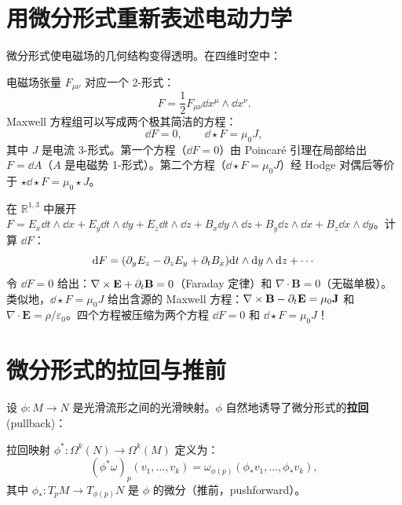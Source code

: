 \section{用微分形式重新表述电动力学}

微分形式使电磁场的几何结构变得透明。在四维时空中：

\begin{definition}[电磁场 2-形式]
电磁场张量 $F_{\mu\nu}$ 对应一个 2-形式：
\begin{equation}
    F = \frac{1}{2} F_{\mu\nu} \dd x^\mu \wedge \dd x^\nu.
\end{equation}
Maxwell 方程组可以写成两个极其简洁的方程：
\begin{equation}
    \dd F = 0, \qquad \dd \star F = \mu_0 J,
\end{equation}
其中 $J$ 是电流 3-形式。第一个方程（$\dd F = 0$）由 Poincaré 引理在局部给出 $F = \dd A$（$A$ 是电磁势 1-形式）。第二个方程（$\dd \star F = \mu_0 J$）经 Hodge 对偶后等价于 $\star \dd \star F = \mu_0 \star J$。

在 $\mathbb{R}^{1,3}$ 中展开 $F = E_x \dd t \wedge \dd x + E_y \dd t \wedge \dd y + E_z \dd t \wedge \dd z + B_x \dd y \wedge \dd z + B_y \dd z \wedge \dd x + B_z \dd x \wedge \dd y$。计算 $\dd F$：
\begin{equation}
    \dd F = (\partial_y E_z - \partial_z E_y + \partial_t B_x) \dd t \wedge \dd y \wedge \dd z + \cdots
\end{equation}
令 $\dd F = 0$ 给出：$\nabla \times \mathbf{E} + \partial_t \mathbf{B} = 0$（Faraday 定律）和 $\nabla \cdot \mathbf{B} = 0$（无磁单极）。类似地，$\dd \star F = \mu_0 J$ 给出含源的 Maxwell 方程：$\nabla \times \mathbf{B} - \partial_t \mathbf{E} = \mu_0 \mathbf{J}$ 和 $\nabla \cdot \mathbf{E} = \rho/\varepsilon_0$。四个方程被压缩为两个方程 $\dd F = 0$ 和 $\dd \star F = \mu_0 J$！
\end{definition}

\section{微分形式的拉回与推前}

设 $\phi: M \to N$ 是光滑流形之间的光滑映射。$\phi$ 自然地诱导了微分形式的\textbf{拉回} (pullback)：

\begin{definition}[拉回]
拉回映射 $\phi^*: \Omega^k(N) \to \Omega^k(M)$ 定义为：
\begin{equation}
    (\phi^* \omega)_p (v_1, \ldots, v_k) = \omega_{\phi(p)} (\phi_* v_1, \ldots, \phi_* v_k),
\end{equation}
其中 $\phi_*: T_pM \to T_{\phi(p)}N$ 是 $\phi$ 的微分（推前，pushforward）。
\end{definition}

